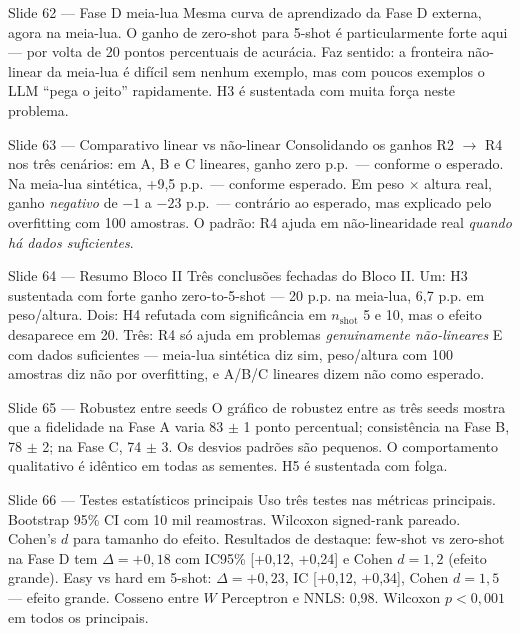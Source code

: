 \documentclass[aspectratio=169,10pt]{beamer}
\begin{document}
\begin{frame}{Slide 62 --- Fase D meia-lua}
\footnotesize
Mesma curva de aprendizado da Fase D externa, agora na meia-lua. O ganho de zero-shot para 5-shot \'e particularmente forte aqui --- por volta de 20 pontos percentuais de acur\'acia. Faz sentido: a fronteira n\~ao-linear da meia-lua \'e dif\'icil sem nenhum exemplo, mas com poucos exemplos o LLM ``pega o jeito'' rapidamente. H3 \'e sustentada com muita for\c{c}a neste problema.
\end{frame}

\begin{frame}{Slide 63 --- Comparativo linear vs n\~ao-linear}
\footnotesize
Consolidando os ganhos R2 $\to$ R4 nos tr\^es cen\'arios: em A, B e C lineares, ganho zero p.p.\ --- conforme o esperado. Na meia-lua sint\'etica, +9,5 p.p.\ --- conforme esperado. Em peso $\times$ altura real, ganho \emph{negativo} de $-1$ a $-23$ p.p.\ --- contr\'ario ao esperado, mas explicado pelo overfitting com 100 amostras. O padr\~ao: R4 ajuda em n\~ao-linearidade real \emph{quando h\'a dados suficientes}.
\end{frame}

\begin{frame}{Slide 64 --- Resumo Bloco II}
\footnotesize
Tr\^es conclus\~oes fechadas do Bloco II. Um: H3 sustentada com forte ganho zero-to-5-shot --- 20 p.p. na meia-lua, 6,7 p.p. em peso/altura. Dois: H4 refutada com signific\^ancia em $n_{\text{shot}}$ 5 e 10, mas o efeito desaparece em 20. Tr\^es: R4 s\'o ajuda em problemas \emph{genuinamente n\~ao-lineares} E com dados suficientes --- meia-lua sint\'etica diz sim, peso/altura com 100 amostras diz n\~ao por overfitting, e A/B/C lineares dizem n\~ao como esperado.
\end{frame}

\begin{frame}{Slide 65 --- Robustez entre seeds}
\footnotesize
O gr\'afico de robustez entre as tr\^es seeds mostra que a fidelidade na Fase A varia 83 $\pm$ 1 ponto percentual; consist\^encia na Fase B, 78 $\pm$ 2; na Fase C, 74 $\pm$ 3. Os desvios padr\~oes s\~ao pequenos. O comportamento qualitativo \'e id\^entico em todas as sementes. H5 \'e sustentada com folga.
\end{frame}

\begin{frame}{Slide 66 --- Testes estat\'isticos principais}
\footnotesize
Uso tr\^es testes nas m\'etricas principais. Bootstrap 95\% CI com 10 mil reamostras. Wilcoxon signed-rank pareado. Cohen's $d$ para tamanho do efeito. Resultados de destaque: few-shot vs zero-shot na Fase D tem $\Delta = +0,18$ com IC95\% [+0,12, +0,24] e Cohen $d = 1,2$ (efeito grande). Easy vs hard em 5-shot: $\Delta = +0,23$, IC [+0,12, +0,34], Cohen $d = 1,5$ --- efeito grande. Cosseno entre $W$ Perceptron e NNLS: 0,98. Wilcoxon $p < 0,001$ em todos os principais.
\end{frame}
\end{document}

